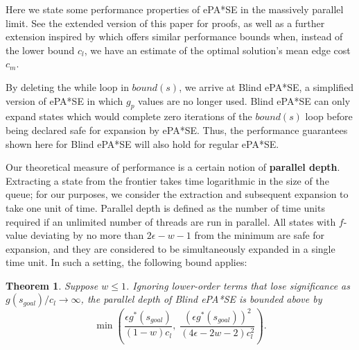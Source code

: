 \documentclass[letterpaper]{article}
\newtheorem{thm}{Theorem}
\begin{document}
Here we state some performance properties of ePA*SE in the massively parallel limit. See the extended version of this paper for proofs, as well as a further extension inspired by \cite{klein1997randomized} which offers similar performance bounds when, instead of the lower bound $c_l$, we have an estimate of the optimal solution's mean edge cost $c_m$.

By deleting the while loop in $bound(s)$, we arrive at Blind ePA*SE, a simplified version of ePA*SE in which $g_p$ values are no longer used. Blind ePA*SE can only expand states which would complete zero iterations of the $bound(s)$ loop before being declared safe for expansion by ePA*SE. Thus, the performance guarantees shown here for Blind ePA*SE will also hold for regular ePA*SE.

Our theoretical measure of performance is a certain notion of \textbf{parallel depth}. Extracting a state from the frontier takes time logarithmic in the size of the queue; for our purposes, we consider the extraction and subsequent expansion to take one unit of time. Parallel depth is defined as the number of time units required if an unlimited number of threads are run in parallel. All states with $f$-value deviating by no more than $2\epsilon-w-1$ from the minimum are safe for expansion, and they are considered to be simultaneously expanded in a single time unit. In such a setting, the following bound applies:

\begin{thm}
\label{thm:depth}
Suppose $w \le 1$. Ignoring lower-order terms that lose significance as $g(s_{goal})/c_l \rightarrow \infty$, the parallel depth of Blind ePA*SE is bounded above by
\[\min\left(\frac{\epsilon g^*(s_{goal})}{(1-w)c_l},\;
\frac{\left(\epsilon g^*(s_{goal})\right)^2 }{(4\epsilon-2w-2)c_l^2}\right).\]
\end{thm}
\end{document}
